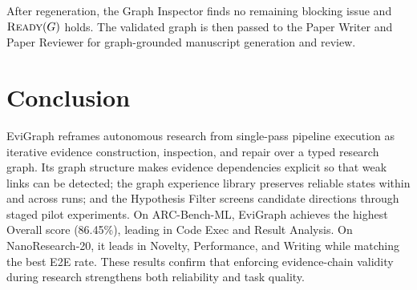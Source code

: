 \documentclass[letterpaper]{article} %
\begin{document}
After regeneration, the Graph Inspector finds no remaining blocking issue and $\textsc{Ready}(G)$ holds. The validated graph is then passed to the Paper Writer and Paper Reviewer for graph-grounded manuscript generation and review.


\section{Conclusion}
\label{sec:conclusion}

EviGraph reframes autonomous research from single-pass pipeline execution as iterative evidence construction, inspection, and repair over a typed research graph. Its graph structure makes evidence dependencies explicit so that weak links can be detected; the graph experience library preserves reliable states within and across runs; and the Hypothesis Filter screens candidate directions through staged pilot experiments. On ARC-Bench-ML, EviGraph achieves the highest Overall score (86.45\%), leading in Code Exec and Result Analysis. On NanoResearch-20, it leads in Novelty, Performance, and Writing while matching the best E2E rate. These results confirm that enforcing evidence-chain validity during research strengthens both reliability and task quality.



\clearpage
\appendix
\def\isAppendixMainFile{}

\end{document}

